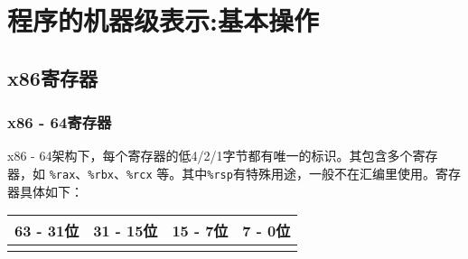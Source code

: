 \section{程序的机器级表示:基本操作}
\subsection{x86寄存器}
\subsubsection{x86 - 64寄存器}
x86 - 64架构下，每个寄存器的低4/2/1字节都有唯一的标识。其包含多个寄存器，如 \texttt{\%rax}、\texttt{\%rbx}、\texttt{\%rcx} 等。其中\texttt{\%rsp}有特殊用途，一般不在汇编里使用。寄存器具体如下：
\begin{table}[H]
    \captionsetup{skip=4pt}
    \centering
    \setlength{\arrayrulewidth}{1pt}
    \begin{tabular}{cccc}
        \hline
        63 - 31位 & 31 - 15位 & 15 - 7位 & 7 - 0位 \\
        \hline
        \texttt{%
        \texttt{%
        \texttt{%
        \texttt{%
        \texttt{%
        \texttt{%
        \texttt{%
        \texttt{%
        \texttt{%
        \texttt{%

\end{tabular}
\end{table}
